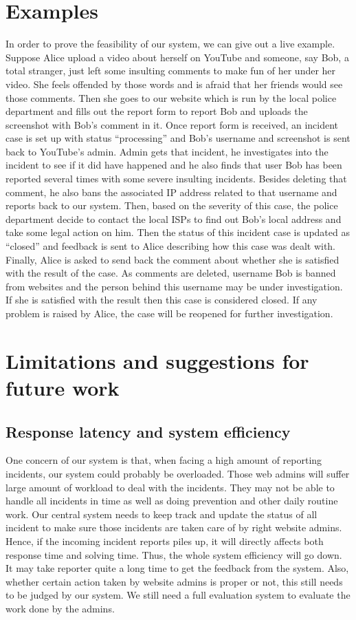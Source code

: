 \section{Examples}
In order to prove the feasibility of our system, we can give out a live example. Suppose Alice upload a video about herself on YouTube and someone, say Bob, a total stranger, just left some insulting comments to make fun of her under her video. She feels offended by those words and is afraid that her friends would see those comments. Then she goes to our website which is run by the local police department and fills out the report form to report Bob and uploads the screenshot with Bob’s comment in it. Once report form is received, an incident case is set up with status “processing” and Bob’s username and screenshot is sent back to YouTube’s admin. Admin gets that incident, he investigates into the incident to see if it did have happened and he also finds that user Bob has been reported several times with some severe insulting incidents. Besides deleting that comment, he also bans the associated IP address related to that username and reports back to our system. Then, based on the severity of this case, the police department decide to contact the local ISPs to find out Bob’s local address and take some legal action on him. Then the status of this incident case is updated as “closed” and feedback is sent to Alice describing how this case was dealt with. Finally, Alice is asked to send back the comment about whether she is satisfied with the result of the case. As comments are deleted, username Bob is banned from websites and the person behind this username may be under investigation. If she is satisfied with the result then this case is considered closed. If any problem is raised by Alice, the case will be reopened for further investigation. 

\section{Limitations and suggestions for future work}
\subsection{Response latency and system efficiency}
One concern of our system is that, when facing a high amount of reporting incidents, our system could probably be overloaded. Those web admins will suffer large amount of workload to deal with the incidents. They may not be able to handle all incidents in time as well as doing prevention and other daily routine work. Our central system needs to keep track and update the status of all incident to make sure those incidents are taken care of by right website admins. Hence, if the incoming incident reports piles up, it will directly affects both response time and solving time. Thus, the whole system efficiency will go down. It may take reporter quite a long time to get the feedback from the system. Also, whether certain action taken by website admins is proper or not, this still needs to be judged by our system. We still need a full evaluation system to evaluate the work done by the admins.  

